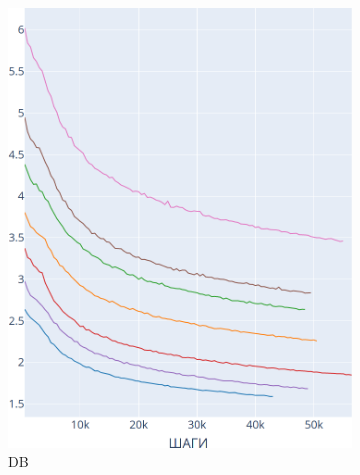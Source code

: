 \documentclass{spbau-diploma}
\begin{document}
\begin{figure}[h]
\begin{subfigure}{.3\textwidth}
		\includegraphics[scale=0.2]{BooksCorpus_DB}
		\caption{DB}
		\label{fig:BooksCorpus_graphs_DB}
	\end{subfigure}
	\begin{subfigure}{.3\textwidth}
		\centering

\end{subfigure}
\end{figure}
\end{document}
